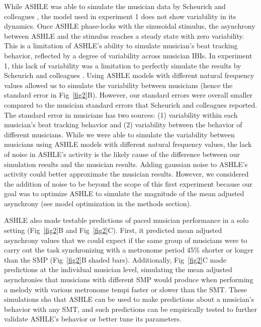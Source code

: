 \documentclass[10pt,letterpaper]{article}
\begin{document}
While ASHLE was able to simulate the musician data by Scheurich and colleagues \cite{scheurich2018tapping}, the model used in experiment 1 does not show variability in its dynamics. Once ASHLE phase-locks with the sinusoidal stimulus, the asynchrony between ASHLE and the stimulus reaches a steady state with zero variability. This is a limitation of ASHLE's ability to simulate musician's beat tracking behavior, reflected by a degree of variability across musician IBIs. In experiment 1, this lack of variability was a limitation to perfectly simulate the results by Scheurich and colleagues \cite{scheurich2018tapping}. Using ASHLE models with different natural frequency values allowed us to simulate the variability between musicians (hence the standard error in Fig~\ref{fig2}B). However, our standard errors were overall smaller compared to the musician standard errors that Scheurich and colleagues \cite{scheurich2018tapping} reported. The standard error in musicians has two sources: (1) variability within each musician's beat tracking behavior and (2) variability between the behavior of different musicians. While we were able to simulate the variability between musicians using ASHLE models with different natural frequency values, the lack of noise in ASHLE's activity is the likely cause of the difference between our simulation results and the musician results. Adding gaussian noise to ASHLE's activity could better approximate the musician results. However, we considered the addition of noise to be beyond the scope of this first experiment because our goal was to optimize ASHLE to simulate the magnitude of the mean adjusted asynchrony (see model optimization in the methods section).

ASHLE also made testable predictions of paced musician performance in a solo setting (Fig~\ref{fig2}B and Fig~\ref{fig2}C). First, it predicted mean adjusted asynchrony values that we could expect if the same group of musicians were to carry out the task synchronizing with a metronome period 45\% shorter or longer than the SMP (Fig~\ref{fig2}B shaded bars). Additionally, Fig~\ref{fig2}C made predictions at the individual musician level, simulating the mean adjusted asynchronies that musicians with different SMP would produce when performing a melody with various metronome tempi faster or slower than the SMT. These simulations sho that ASHLE can be used to make predictions about a musician's behavior with any SMT, and such predictions can be empirically tested to further validate ASHLE's behavior or better tune its parameters.
\end{document}
